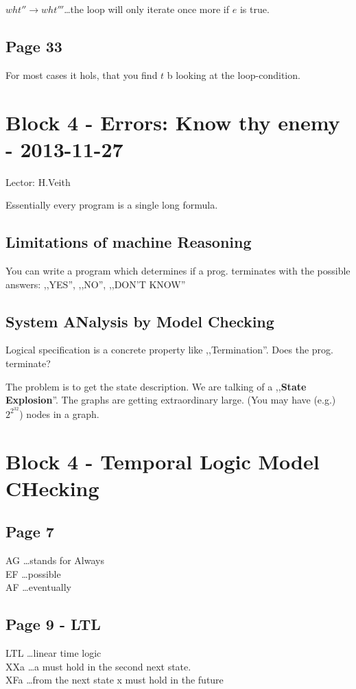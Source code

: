 \documentclass[a4paper]{article}
\begin{document}
$wht'' \rightarrow wht'''$\ldots the loop will only iterate once more if $e$
is true.


\subsection{Page 33}
For most cases it hols, that you find $t$ b looking at the loop-condition.


\section{Block 4 - Errors: Know thy enemy - 2013-11-27}
Lector: H.Veith

Essentially every program is a single long formula.

\subsection{Limitations of machine Reasoning}

You can write a program which determines if a prog. terminates with the possible
answers: ,,YES'', ,,NO'', ,,DON'T KNOW''

\subsection{System ANalysis by Model Checking}
Logical specification is a concrete property like ,,Termination''. Does the
prog. terminate?

The problem is to get the state description. We are talking of a
,,\textbf{State Explosion}''. The graphs are getting extraordinary large. (You
may have (e.g.) $2^{2^{32}}$) nodes in a graph.


\section{Block 4 - Temporal Logic Model CHecking}

\subsection{Page 7}
AG \ldots stands for Always\\
EF \ldots possible\\
AF \ldots eventually

\subsection{Page 9 - LTL}
LTL \ldots linear time logic\\
XXa \ldots a must hold in the second next state.\\
XFa \ldots from the next state x must hold in the future
\end{document}
